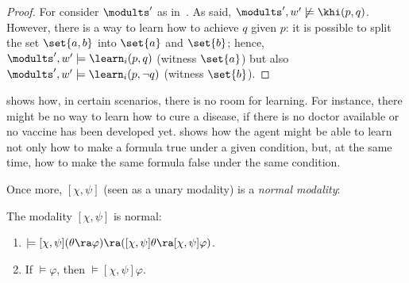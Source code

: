 \begin{proof}
For  consider $\modults'$ as in~.
As said, $\modults',w'\not\models\khi(p,q)$.
However, there is a way to learn how to achieve $q$ given $p$: it is possible to split the set $\set{a,b}$ into $\set{a}$ and $\set{b}$; hence, $\modults',w'\models \learn_i(p,q)$ (witness $\set{a}$) but also $\modults',w'\models\learn_i(p,\neg q)$ (witness $\set{b}$).
\end{proof}

 shows how, in certain scenarios, there is
no room for learning. For instance, there might be no way to learn how
to cure a disease, if there is no doctor
available or no vaccine has been developed yet.  shows how the agent might be able
to learn not only how to make a formula true under a given condition,
but, at the same time, how to make the same formula false under the same condition.

Once more, $[\chi,\psi]$ (seen as a unary modality) is a \emph{normal modality}:

\medskip

\begin{proposition}\label{prop:lhgoal-normal}
The modality $[\chi,\psi]$ is normal:
\begin{enumerate}
\item\label{itm:distaxiom} $\models[\chi,\psi](\theta \ra \varphi) \ra ([\chi,\psi]\theta \ra [\chi,\psi]\varphi)$.
\item\label{itm:necessitation} If $\models\varphi$, then $\models{[\chi,\psi]\varphi}$.
\end{enumerate}
\end{proposition}

\medskip


